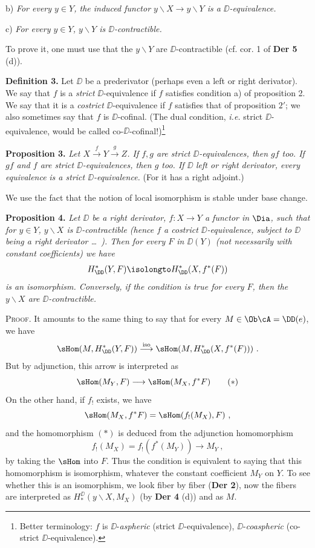 b) \textit{For every $y \in Y$, the induced functor $y\backslash X \to y\backslash Y$ is a $\DD$-equivalence.}

c) \textit{For every $y \in Y$, $y\backslash Y$ is $\DD$-contractible.}

\noindent To prove it, one must use that the $y\backslash Y$ are $\DD$-contractible (cf. cor. 1 of \textbf{Der 5} (d)).

\clearpage
{}
\noindent{}

\noindent\textbf{Definition 3.} Let $\DD$ be a prederivator (perhaps even a left or right derivator). We say that $f$ is a \textit{strict} $\DD$-equivalence if $f$ satisfies condition a) of proposition 2. We say that it is a \textit{costrict} $\DD$-equivalence if $f$ satisfies that of proposition $2'$; we also sometimes say that $f$ is $\DD$-cofinal. (The dual condition, \textit{i.e.} strict $\DD$-equivalence, would be called co-$\DD$-cofinal!)\footnote[27]{Better terminology: $f$ is $\DD$-\textit{aspheric} (strict $\DD$-equivalence), $\DD$-\textit{coaspheric} (co-strict $\DD$-equivalence).} %

\noindent\textbf{Proposition 3.} \textit{Let $X \overset{f}{\to} Y \overset{g}{\to} Z$. If $f, g$ are strict $\DD$-equivalences, then $gf$ too. If $gf$ and $f$ are strict $\DD$-equivalences, then $g$ too. If $\DD$} \textit{left or right derivator, every equivalence} \textit{is a strict $\DD$-equivalence.} (For it has a right adjoint.)

We use the fact that the notion of local isomorphism is stable under base change.

\noindent{}

\noindent\textbf{Proposition 4.} \textit{Let $\DD$ be a right derivator, $f : X \to Y$ a functor in} $\Dia$\textit{, such that for $y \in Y$, $y\backslash X$ is $\DD$-contractible (hence $f$ a costrict $\DD$-equivalence, subject to $\DD$ being a right derivator \ldots\ ). Then for every $F$ in $\DD(Y)$ (not necessarily with constant coefficients) we have} %
\[
H^*_{\DD}(Y, F) \isolongto H^*_{\DD}(X, f^*(F))
\]
\textit{is an isomorphism. Conversely, if the condition is true for every $F$, then the $y\backslash X$ are $\DD$-contractible.}

\noindent\textsc{Proof}. It amounts to the same thing to say that for every $M \in \Ob \cA = \DD(e)$, we have
\[
\sHom(M, H^*_{\DD}(Y, F)) \overset{\mathrm{iso}}{\longrightarrow} \sHom(M, H^*_{\DD}(X, f^*(F))) \ .
\]
But by adjunction, this arrow is interpreted as
\[
\sHom(M_Y, F) \longrightarrow \sHom(M_X, f^*F) \tag*{$(*)$}
\]
On the other hand, if $f_!$ exists, we have
\[
\sHom(M_X, f^*F) = \sHom(f_!(M_X), F) \ ,
\]
and the homomorphism $(*)$ is deduced from the adjunction homomorphism
\[
f_!(M_X) = f_!(f^*(M_Y)) \longrightarrow M_Y \ , \tag*{$(**)$}
\]
by taking the $\sHom$ into $F$. Thus the condition is equivalent to saying that this homomorphism is isomorphism, whatever the constant coefficient $M_Y$ on $Y$. To see whether this is an isomorphism, we look fiber by fiber (\textbf{Der 2}), now the fibers are interpreted as $H^{\DD}_*(y\backslash X, M_X)$ (by \textbf{Der 4} (d)) and as $M$.